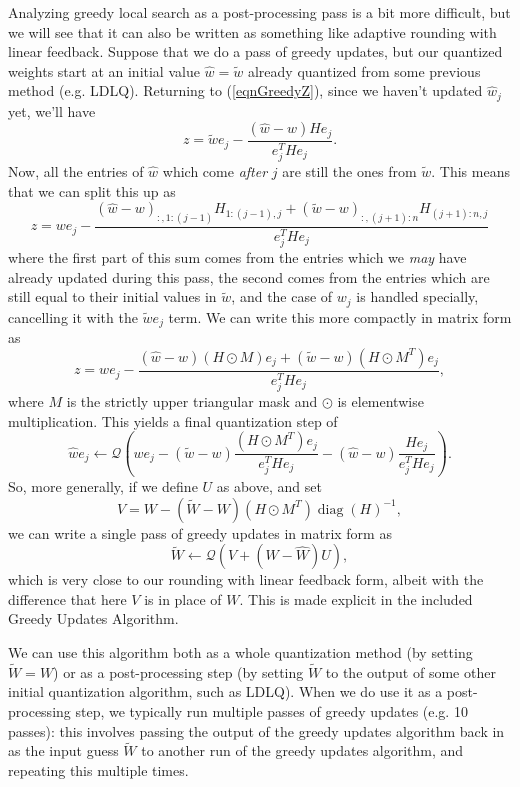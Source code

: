 Analyzing greedy local search as a post-processing pass is a bit more difficult, but we will see that it can also be written as something like adaptive rounding with linear feedback.
Suppose that we do a pass of greedy updates, but our quantized weights start at an initial value $\hat w = \tilde w$ already quantized from some previous method (e.g. LDLQ).
Returning to (\ref{eqnGreedyZ}), since we haven't updated $\hat w_j$ yet, we'll have
\[
    z
    =
    \tilde w e_j
    -
    \frac{
        (\hat w - w) H e_j
    }{
        e_j^T H e_j
    }.
\]
Now, all the entries of $\hat w $ which come \emph{after} $j$ are still the ones from $\tilde w$. This means that we can split this up as
\[
    z
    =
    w e_j
    -
    \frac{
        (\hat w - w)_{:,1:(j-1)} H_{1:(j-1),j}
        +
        (\tilde w - w)_{:,(j+1):n} H_{(j+1):n,j}
    }{
        e_j^T H e_j
    }
\]
where the first part of this sum comes from the entries which we \emph{may} have already updated during this pass, the second comes from the entries which are still equal to their initial values in $\tilde w$, and the case of $w_j$ is handled specially, cancelling it with the $\tilde w e_j$ term.
We can write this more compactly in matrix form as
\[
    z
    =
    w e_j
    -
    \frac{
        (\hat w - w) (H \odot M) e_j
        +
        (\tilde w - w) (H \odot M^T) e_j
    }{
        e_j^T H e_j
    },
\]
where $M$ is the strictly upper triangular mask and $\odot$ is elementwise multiplication. This yields a final quantization step of
\[
    \hat w e_j \gets \mathcal{Q}\left( w e_j - (\tilde w - w) \frac{
        (H \odot M^T) e_j
    }{
        e_j^T H e_j
    }
    - 
    (\hat w - w) \frac{
        H e_j
    }{
        e_j^T H e_j
    } \right).
\]
So, more generally, if we define $U$ as above, and set
\[
    V = W - (\tilde W - W) (H \odot M^T) \operatorname{diag}(H)^{-1},
\]
we can write a single pass of greedy updates in matrix form as
\[
    \tilde W \gets \mathcal{Q}( V + (W - \hat W) U ),
\]
which is very close to our rounding with linear feedback form, albeit with the difference that here $V$ is in place of $W$. 
This is made explicit in the included Greedy Updates Algorithm.


We can use this algorithm both as a whole quantization method (by setting $\tilde W = W$) or as a post-processing step (by setting $\tilde W$ to the output of some other initial quantization algorithm, such as LDLQ). When we do use it as a post-processing step, we typically run multiple passes of greedy updates (e.g. 10 passes): this involves passing the output of the greedy updates algorithm back in as the input guess $\tilde W$ to another run of the greedy updates algorithm, and repeating this multiple times.


